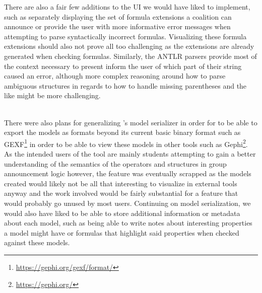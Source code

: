 There are also a fair few additions to the UI we would have liked to implement, such as separately displaying the set of formula extensions a coalition can announce or provide the user with more informative error messages when attempting to parse syntactically incorrect formulas. Visualizing these formula extensions should also not prove all too challenging as the extensions are already generated when checking formulas. Similarly, the ANTLR parsers provide most of the context necessary to present inform the user of which part of their string caused an error, although more complex reasoning around how to parse ambiguous structures in regards to how to handle missing parentheses and the like might be more challenging. 

\\

There were also plans for generalizing \cname{}'s model serializer in order for to be able to export the models as formats beyond its current basic binary format such as GEXF\footnote{\url{https://gephi.org/gexf/format/}} in order to be able to view these models in other tools such as Gephi\footnote{\url{https://gephi.org/}}. As the intended users of the tool are mainly students attempting to gain a better understanding of the semantics of the operators and structures in group announcement logic however, the feature was eventually scrapped as the models created would likely not be all that interesting to visualize in external tools anyway and the work involved would be fairly substantial for a feature that would probably go unused by most users.  Continuing on model serialization, we would also have liked to be able to store additional information or metadata about each model, such as being able to write notes about interesting properties a model might have or formulas that highlight said properties when checked against these models. 

